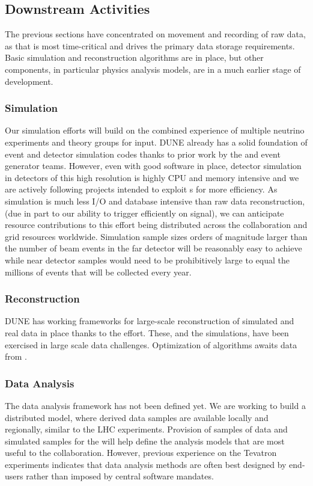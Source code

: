 \subsection{Downstream Activities}

The previous sections have concentrated on movement and recording of raw data, as that is most time-critical and drives the primary data storage requirements. Basic simulation and reconstruction algorithms are in place, but other components, in particular physics analysis models, are in a much earlier stage of development. 

\subsubsection{Simulation}  Our simulation efforts will build on the combined experience of multiple neutrino experiments and theory groups for input.  DUNE already has a solid foundation of event and detector simulation codes thanks to prior work by the  and event generator teams.  However,   even with good software in place, detector simulation in detectors of this high resolution is highly CPU and memory intensive and we are actively following projects intended to exploit s for more efficiency.  As simulation is much less I/O and database intensive than raw data reconstruction, (due in part to our ability to trigger efficiently on signal), we can anticipate resource contributions to this effort being distributed across the collaboration and grid resources worldwide. Simulation sample sizes orders of magnitude larger than the number of beam events  in the  far detector will be reasonably easy to achieve while near detector samples would need to be prohibitively large to equal the millions of events that will be collected every year. 

\subsubsection{Reconstruction} DUNE has working frameworks for large-scale reconstruction of simulated and real data in place thanks to the  effort.  These, and the simulations, have been exercised in large scale data challenges. Optimization of algorithms awaits data from . 
 
 \subsubsection{Data Analysis}
 The  data analysis framework has not been defined yet.  We are working to build a distributed model, where derived data samples are available locally and regionally, similar to the LHC experiments.   Provision of samples  of  data and simulated samples for the  will help define the analysis models that are most useful to the collaboration. However,  previous experience on the Tevatron experiments indicates that data analysis methods are often best designed by end-users rather than imposed by central software mandates. 
 
